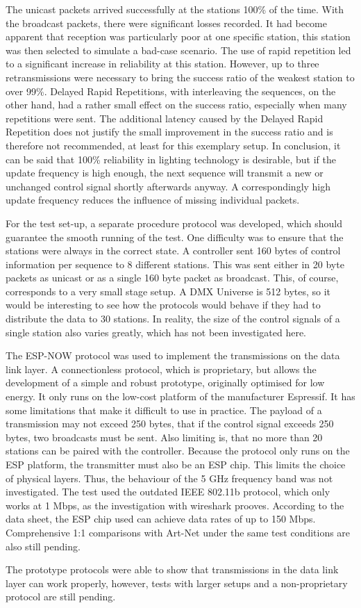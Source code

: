 The unicast packets arrived successfully at the stations 100\% of the time.
With the broadcast packets, there were significant losses recorded.
It had become apparent that reception was particularly poor at one specific station,
this station was then selected to simulate a bad-case scenario.
The use of rapid repetition led to a significant increase in reliability at this station.
However, up to three retransmissions were necessary to bring the success ratio of the weakest station to over 99\%.
Delayed Rapid Repetitions, with interleaving the sequences, on the other hand, 
had a rather small effect on the success ratio,
especially when many repetitions were sent.
The additional latency caused by the Delayed Rapid Repetition
does not justify the small improvement in the success ratio and is therefore not recommended,
at least for this exemplary setup.
In conclusion, it can be said that 100\% reliability in lighting technology is desirable,
but if the update frequency is high enough,
the next sequence will transmit a new or unchanged control signal shortly afterwards anyway.
A correspondingly high update frequency reduces the influence of missing individual packets.

For the test set-up, a separate procedure protocol was developed,
which should guarantee the smooth running of the test.
One difficulty was to ensure that the stations were always in the correct state.
A controller sent 160 bytes of control information per sequence to 8 different stations.
This was sent either in 20 byte packets as unicast or as a single 160 byte packet as broadcast.
This, of course, corresponds to a very small stage setup.
A DMX Universe is 512 bytes, so it would be interesting to see
how the protocols would behave if they had to distribute the data to 30 stations.
In reality, the size of the control signals of a single station also varies greatly,
which has not been investigated here.

The ESP-NOW protocol was used to implement the transmissions on the data link layer.
A connectionless protocol, which is proprietary, but allows the development of a simple and robust prototype,
originally optimised for low energy.
It only runs on the low-cost platform of the manufacturer Espressif.
It has some limitations that make it difficult to use in practice.
The payload of a transmission may not exceed 250 bytes, 
that if the control signal exceeds 250 bytes, two broadcasts must be sent.
Also limiting is, that no more than 20 stations can be paired with the controller.
Because the protocol only runs on the ESP platform, the transmitter must also be an ESP chip.
This limits the choice of physical layers.
Thus, the behaviour of the 5 GHz frequency band was not investigated.
The test used the outdated IEEE 802.11b protocol, which only works at 1 Mbps,
as the investigation with wireshark prooves.
According to the data sheet, the ESP chip used can achieve data rates of up to 150 Mbps.
Comprehensive 1:1 comparisons with Art-Net under the same test conditions are also still pending.

The prototype protocols were able to show that transmissions in the data link layer can work properly,
however, tests with larger setups and a non-proprietary protocol are still pending.
